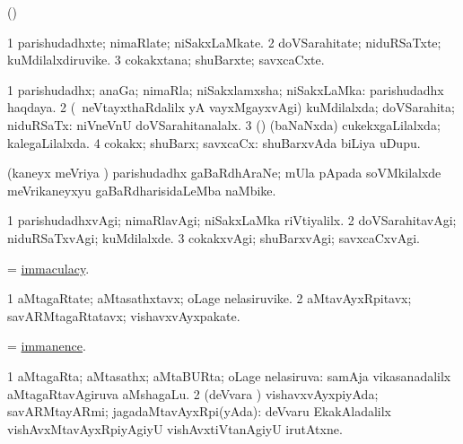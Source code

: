 \bentry
{}
\gl{\saMkiSx}
\bmng
(\birx)  
\emng
\eentry

\bentry
{}
\gl{\nA}
\bmng
\bnum
\num{1} parishudadhxte; nimaRlate; niSakxLaMkate. 
\num{2} doVSarahitate; niduRSaTxte; kuMdilalxdiruvike. 
\num{3} cokakxtana; shuBarxte; savxcaCxte. 
\enum
\emng
\eentry

\bentry
{}
\gl{\gu}
\bmng
\bnum
\num{1} parishudadhx; anaGa; nimaRla; niSakxlamxsha; niSakxLaMka:  parishudadhx haqdaya. 
\num{2} (\sA\ neVtayxthaRdalilx yA vayxMgayxvAgi) kuMdilalxda; doVSarahita; niduRSaTx:  niVneVnU doVSarahitanalalx. 
\num{3} (\jiVvi) (baNaNxda) cukekxgaLilalxda; kalegaLilalxda. 
\num{4} cokakx; shuBarx; savxcaCx:  shuBarxvAda biLiya uDupu. 
\enum
\emng
\eentry

\bentry
{}
\gl{\nA}
\bmng
(kaneyx meVriya \vi) parishudadhx gaBaRdhAraNe; mUla pApada soVMkilalxde meVrikaneyxyu gaBaRdharisidaLeMba naMbike. 
\emng
\eentry

\bentry
{}
\gl{\kirxvi}
\bmng
\bnum
\num{1} parishudadhxvAgi; nimaRlavAgi; niSakxLaMka riVtiyalilx. 
\num{2} doVSarahitavAgi; niduRSaTxvAgi; kuMdilalxde. 
\num{3} cokakxvAgi; shuBarxvAgi; savxcaCxvAgi. 
\enum
\emng
\eentry

\bentry
{}
\gl{\nA}
\bmng
 = \hyperlink{immaculacy}{immaculacy}. 
\emng
\eentry

\bentry
{}
\gl{\nA}
\bmng
\bnum
\num{1} aMtagaRtate; aMtasathxtavx; oLage nelasiruvike. 
\num{2} aMtavAyxRpitavx; savARMtagaRtatavx; vishavxvAyxpakate. 
\enum
\emng
\eentry

\bentry
{}
\gl{\nA}
\bmng
 = \hyperlink{immanence}{immanence}. 
\emng
\eentry

\bentry
{}
\gl{\gu}
\bmng
\bnum
\num{1} aMtagaRta; aMtasathx; aMtaBURta; oLage nelasiruva:  samAja vikasanadalilx aMtagaRtavAgiruva aMshagaLu. 
\num{2} (deVvara \vi) vishavxvAyxpiyAda; savARMtayARmi; jagadaMtavAyxRpi(yAda):  deVvaru EkakAladalilx vishAvxMtavAyxRpiyAgiyU vishAvxtiVtanAgiyU irutAtxne. 
\enum
\emng
\eentry

